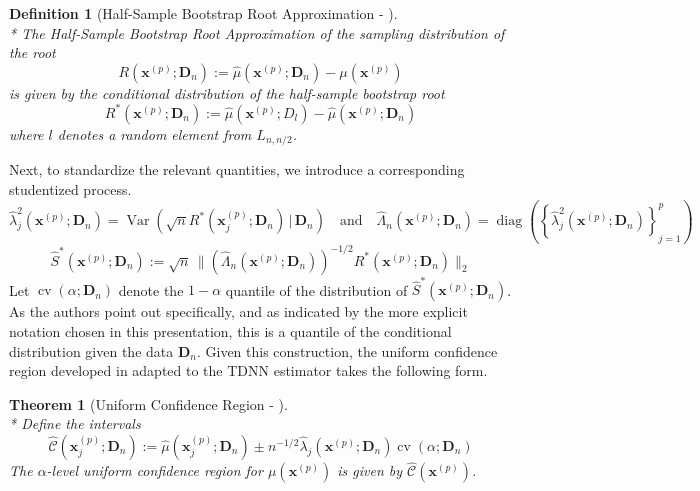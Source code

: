 \documentclass[letterpaper,10pt]{article}
\numberwithin{equation}{section}
\newtheorem{thm}{Theorem}
\numberwithin{thm}{section}
\newtheorem{dfn}{Definition}
\numberwithin{lem}{section}
\numberwithin{cor}{section}
\renewcommand{\hat}{\widehat}
\newcommand{\1}{\mathbb{1}}
\begin{document}
\begin{dfn}[Half-Sample Bootstrap Root Approximation - \citet{ritzwoller_uniform_2024}]\mbox{}\\*
	The Half-Sample Bootstrap Root Approximation of the sampling distribution of the root
	\begin{equation}
		R\left(\mathbf{x}^{(p)}; \mathbf{D}_n\right)
		:= \hat{\mu}\left(\mathbf{x}^{(p)}; \mathbf{D}_n\right) - \mu(\mathbf{x}^{(p)})
	\end{equation}
	is given by the conditional distribution of the half-sample bootstrap root
	\begin{equation}
		R^{*}\left(\mathbf{x}^{(p)}; \mathbf{D}_n\right)
		:= \hat{\mu}\left(\mathbf{x}^{(p)}; D_l\right) - \hat{\mu}\left(\mathbf{x}^{(p)}; \mathbf{D}_n\right)
	\end{equation}
	where $l$ denotes a random element from $L_{n, n/2}$.
\end{dfn}
Next, to standardize the relevant quantities, we introduce a corresponding studentized process.
\begin{equation}
	\hat{\lambda}_{j}^{2}\left(\mathbf{x}^{(p)}; \mathbf{D}_n\right) = \operatorname{Var}\left(\sqrt{n} R^{*}(\mathbf{x}^{(p)}_{j}; \mathbf{D}_n) \, | \, \mathbf{D}_n\right)
	\quad \text{and} \quad
	\hat{\Lambda}_n\left(\mathbf{x}^{(p)}; \mathbf{D}_n\right) = \operatorname{diag}\left(\left\{\hat{\lambda}_{j}^{2}\left(\mathbf{x}^{(p)}; \mathbf{D}_n\right)\right\}_{j = 1}^{p}\right)
\end{equation}
\begin{equation}
	\hat{S}^{*}\left(\mathbf{x}^{(p)}; \mathbf{D}_n\right)
	:= \sqrt{n} \, \Big\| \left(\hat{\Lambda}_n\left(\mathbf{x}^{(p)}; \mathbf{D}_n\right)\right)^{-1/2} R^{*}\left(\mathbf{x}^{(p)}; \mathbf{D}_n\right)\Big\|_{2}
\end{equation}
Let $\operatorname{cv}\left(\alpha; \mathbf{D}_n\right)$ denote the $1-\alpha$ quantile of the distribution of $\hat{S}^{*}\left(\mathbf{x}^{(p)}; \mathbf{D}_n\right)$.
As the authors point out specifically, and as indicated by the more explicit notation chosen in this presentation, this is a quantile of the conditional distribution given the data $\mathbf{D}_n$.
Given this construction, the uniform confidence region developed in \citet{ritzwoller_uniform_2024} adapted to the TDNN estimator takes the following form.


\begin{thm}[Uniform Confidence Region - \citet{ritzwoller_uniform_2024}]\mbox{}\\*
	Define the intervals
	\begin{equation}
		\hat{\mathcal{C}}\left(\mathbf{x}^{(p)}_j; \mathbf{D}_n\right)
		:= \hat{\mu}\left(\mathbf{x}^{(p)}_{j}; \mathbf{D}_n\right) \pm
		n^{-1/2} \hat{\lambda}_{j}\left(\mathbf{x}^{(p)}; \mathbf{D}_n\right)\operatorname{cv}\left(\alpha; \mathbf{D}_n\right)
	\end{equation}
	The $\alpha$-level uniform confidence region for $\mu\left(\mathbf{x}^{(p)}\right)$ is given by $\hat{\mathcal{C}}\left(\mathbf{x}^{(p)}\right)$.
\end{thm}
\end{document}
